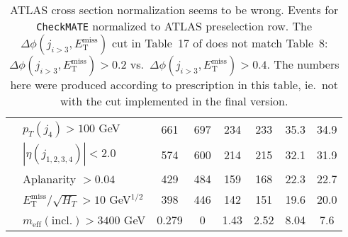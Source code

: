 \documentclass[10pt,fleqn]{article}
\newcommand{\Checkmate}{\texttt{CheckMATE}}
\newcommand{\met}{E^\mathrm{miss}_\mathrm{T}}
\newcommand{\meff}{m_\mathrm{eff}}
\begin{document}
\begin{table}[H]
\begin{tabular}{c|l|c|c|c|c|c|c}
             & $p_T(j_4) > 100$ GeV                            &      661   &    697    &  234       &   233     &      35.3    &   34.9         \\      
             & $|\eta(j_{1,2,3,4})|< 2.0$                      &      574   &    600    &  214       &   215     &      32.1    &   31.9         \\           
             & Aplanarity $> 0.04$                             &      429   &    484    &  159       &   168     &      22.3    &   22.7         \\           
             & $\met/\sqrt{H_T} > 10$ GeV$^{1/2}$              &      398   &    446    &  142       &   151     &      19.6    &   20.0         \\    
             & $\meff(\mathrm{incl.}) > 3400$ GeV              &    0.279   &      0    &  1.43      &   2.52    &      8.04    &   7.6         \\ \bottomrule 
\end{tabular}
\caption{ATLAS cross section normalization seems to be wrong. Events for \Checkmate{} normalized to ATLAS preselection row. The $\Delta\phi(j_{i>3},\met)$ cut in Table~17 of \cite{atlas-conf-2019-040} does not match Table~8: $\Delta\phi(j_{i>3},\met)> 0.2$ vs.\ $\Delta\phi(j_{i>3},\met)>0.4$.  The numbers here were produced according to prescription in this table, ie.\ not with the cut implemented in the final version.}
\end{table}             
\end{document}
